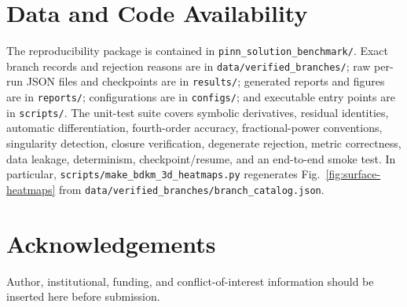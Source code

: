 \documentclass[11pt]{article}
\begin{document}
\section*{Data and Code Availability}

The reproducibility package is contained in
\texttt{pinn\_solution\_benchmark/}.  Exact branch records and rejection
reasons are in \texttt{data/verified\_branches/}; raw per-run JSON files and
checkpoints are in \texttt{results/}; generated reports and figures are in
\texttt{reports/}; configurations are in \texttt{configs/}; and executable
entry points are in \texttt{scripts/}.  The unit-test suite covers symbolic
derivatives, residual identities, automatic differentiation, fourth-order
accuracy, fractional-power conventions, singularity detection, closure
verification, degenerate rejection, metric correctness, data leakage,
determinism, checkpoint/resume, and an end-to-end smoke test.  In particular,
\texttt{scripts/make\_bdkm\_3d\_heatmaps.py} regenerates
Fig.~\ref{fig:surface-heatmaps} from
\texttt{data/verified\_branches/branch\_catalog.json}.

\section*{Acknowledgements}

Author, institutional, funding, and conflict-of-interest information should be
inserted here before submission.
\end{document}
